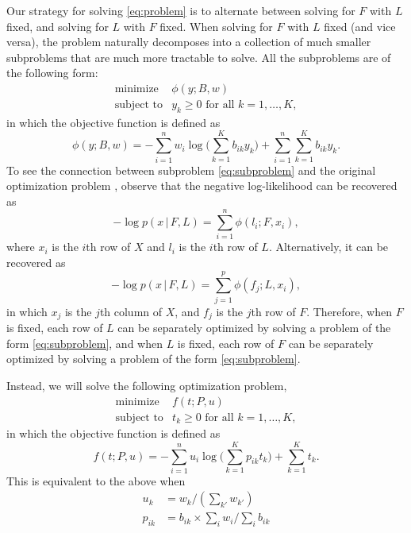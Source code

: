 \documentclass[final]{siamart171218}
\begin{document}
Our strategy for solving \eqref{eq:problem} is to alternate between
solving for $F$ with $L$ fixed, and solving for $L$ with $F$
fixed. When solving for $F$ with $L$ fixed (and vice versa), the
problem naturally decomposes into a collection of much smaller
subproblems that are much more tractable to solve. All the subproblems
are of the following form:
\begin{equation}
\begin{array}{ll}
\mbox{minimize} & \phi(y; B, w) \\
\mbox{subject to} & \mbox{$y_k \geq 0$ for all $k = 1, \ldots, K$},
\end{array}
\label{eq:subproblem}
\end{equation}
in which the objective function is defined as
\begin{equation}
\phi(y; B, w) =
    - \sum_{i=1}^n w_i \log\big({\textstyle \sum_{k=1}^K b_{ik} y_k}\big)
    + \sum_{i=1}^n \sum_{k=1}^K b_{ik} y_k.
\label{eq:subproblem-objective}
\end{equation}
To see the connection between subproblem \eqref{eq:subproblem} and the
original optimization problem \label{eq:problem}, observe that the
negative log-likelihood can be recovered as
\begin{equation}
-\log p(x \,|\, F, L) = \sum_{i=1}^n \phi(l_i; F, x_i),
\end{equation}
where $x_i$ is the $i$th row of $X$ and $l_i$ is the $i$th row of $L$.
Alternatively, it can be recovered as
\begin{equation}
-\log p(x \,|\, F, L) = \sum_{j=1}^p \phi(f_j; L, x_i),
\end{equation}
in which $x_j$ is the $j$th column of $X$, and $f_j$ is the $j$th row
of $F$. Therefore, when $F$ is fixed, each row of $L$ can be
separately optimized by solving a problem of the form
\eqref{eq:subproblem}, and when $L$ is fixed, each row of $F$ can be
separately optimized by solving a problem of the form
\eqref{eq:subproblem}.

Instead, we will solve the following optimization problem,
\begin{equation}
\begin{array}{ll}
\mbox{minimize}   & f(t; P, u) \\
\mbox{subject to} & \mbox{$t_k \geq 0$ for all $k = 1, \ldots, K$},
\end{array}
\end{equation}
in which the objective function is defined as
\begin{equation}
f(t; P, u) =
    - \sum_{i=1}^n u_i \log\big({\textstyle \sum_{k=1}^K p_{ik} t_k}\big)
    + \sum_{k=1}^K t_k.
\end{equation}
This is equivalent to the above when
\begin{align*}
u_k    &= w_k/(\sum_{k'} w_{k'}) \\
p_{ik} &= b_{ik} \times \sum_i w_i / \sum_i b_{ik}
\end{align*}



\end{document}
